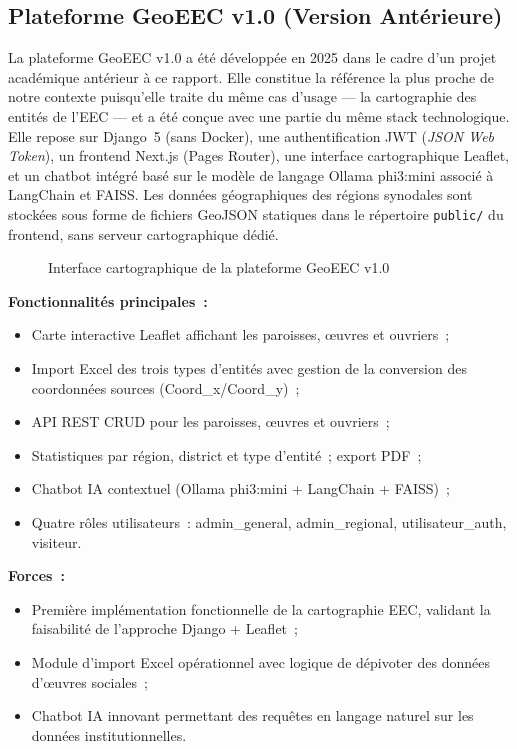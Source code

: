 \documentclass[12pt, a4paper]{report}
\begin{document}
\subsection{Plateforme GeoEEC v1.0 (Version Antérieure)}

La plateforme GeoEEC v1.0 a été développée en 2025 dans le cadre d'un projet
académique antérieur à ce rapport. Elle constitue la référence la plus proche
de notre contexte puisqu'elle traite du même cas d'usage --- la cartographie des
entités de l'EEC --- et a été conçue avec une partie du même stack technologique.
Elle repose sur Django~5 (sans Docker), une authentification JWT
(\textit{JSON Web Token}), un frontend Next.js (Pages Router), une interface
cartographique Leaflet, et un chatbot intégré basé sur le modèle de langage
Ollama phi3:mini associé à LangChain et FAISS. Les données géographiques des
régions synodales sont stockées sous forme de fichiers GeoJSON statiques dans le
répertoire \texttt{public/} du frontend, sans serveur cartographique dédié.

\begin{figure}[H]
  \centering
  \caption{Interface cartographique de la plateforme GeoEEC v1.0}
  \label{fig:geoeec-v1}
\end{figure}

\noindent\textbf{Fonctionnalités principales~:}
\begin{itemize}[itemsep=2pt, topsep=4pt, leftmargin=1.5cm]
  \item Carte interactive Leaflet affichant les paroisses, œuvres et ouvriers~;
  \item Import Excel des trois types d'entités avec gestion de la conversion des
    coordonnées sources (Coord\_x/Coord\_y)~;
  \item API REST CRUD pour les paroisses, œuvres et ouvriers~;
  \item Statistiques par région, district et type d'entité~; export PDF~;
  \item Chatbot IA contextuel (Ollama phi3:mini + LangChain + FAISS)~;
  \item Quatre rôles utilisateurs~: admin\_general, admin\_regional,
    utilisateur\_auth, visiteur.
\end{itemize}

\noindent\textbf{Forces~:}
\begin{itemize}[itemsep=2pt, topsep=4pt, leftmargin=1.5cm]
  \item Première implémentation fonctionnelle de la cartographie EEC, validant
    la faisabilité de l'approche Django + Leaflet~;
  \item Module d'import Excel opérationnel avec logique de dépivoter des données
    d'œuvres sociales~;
  \item Chatbot IA innovant permettant des requêtes en langage naturel sur les
    données institutionnelles.
\end{itemize}
\end{document}
